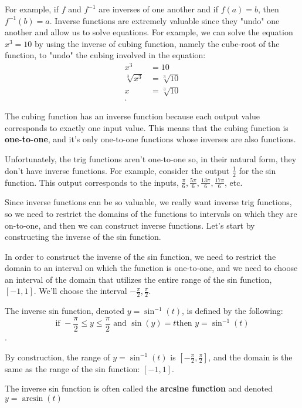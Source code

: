 \label{les_9:inverse_trig_functions}

For example, if $f$ and $f^{-1}$ are inverses of one another and if $f(a) = b$,
then $f^{-1}(b) = a$. Inverse functions are extremely valuable since they "undo"
one another and allow us to solve equations. For example, we can solve the
equation $x^{3} = 10$ by using the inverse of cubing function, namely the
cube-root of the function, to "undo" the cubing involved in the equation:
\begin{align*}
  x^{3} &= 10 \\
  \sqrt[3]{x^{3}} &= \sqrt[3]{10} \\
  x &= \sqrt[3]{10} \\
.\end{align*}

The cubing function has an inverse function because each output value
corresponds to exactly one input value. This means that the cubing function is
\textbf{one-to-one}, and it's only one-to-one functions whose inverses are also
functions.

Unfortunately, the trig functions aren't one-to-one so, in their natural form,
they don't have inverse functions. For example, consider the output
$\frac{1}{2}$ for the sin function. This output corresponds to the inputs,
$\frac{\pi}{6}, \frac{5\pi}{6}, \frac{13\pi}{6}, \frac{17\pi}{6}$, etc.

Since inverse functions can be so valuable, we really want inverse trig
functions, so we need to restrict the domains of the functions to intervals on
which they are on-to-one, and then we can construct inverse functions. Let's
start by constructing the inverse of the sin function.

In order to construct the inverse of the sin function, we need to restrict the
domain to an interval on which the function is one-to-one, and we need to choose
an interval of the domain that utilizes the entire range of the sin function,
$[-1,1]$. We'll choose the interval $-\frac{\pi}{2},\frac{\pi}{2}$.

\begin{definition}
  \label{def:inverse_sin_function}

  The inverse sin function, denoted $y = \sin^{-1} (t)$, is defined by the
  following:
  \[
  \textrm{if } -\frac{\pi}{2} \le y \le \frac{\pi}{2} \textrm{ and } \sin(y) = t
  \textrm{then } y = \sin^{-1} (t)
  \].

  By construction, the range of $y = \sin^{-1} (t)$ is $[-\frac{\pi}{2},
  \frac{\pi}{2}]$, and the domain is the same as the range of the sin function:
  $[-1,1]$.

  \begin{note}
    The inverse sin function is often called the \textbf{arcsine function} and
    denoted $y = \arcsin(t)$
  \end{note}
\end{definition}

